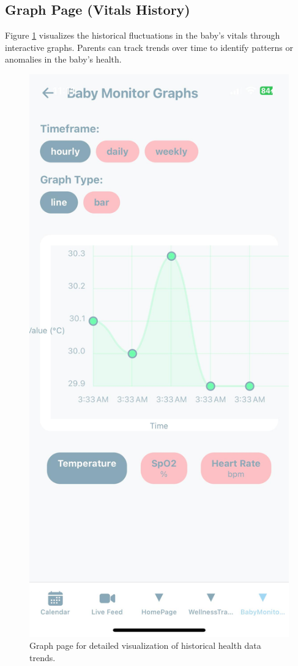 \documentclass[12pt,a4paper]{report}
\begin{document}
\subsection{Graph Page (Vitals History)}
Figure \ref{fig:graph} visualizes the historical fluctuations in the baby’s vitals through interactive graphs. Parents can track trends over time to identify patterns or anomalies in the baby's health.
\begin{figure}[H]
  \centering
  \includegraphics[scale=0.1]{./pic/graphs.jpeg}
  \caption{Graph page for detailed visualization of historical health data trends.}
  \label{fig:graph}
\end{figure}
\end{document}

